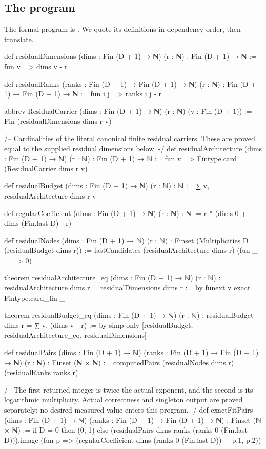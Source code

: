 \documentclass[11pt,a4paper]{article}
\theoremstyle{definition}
\theoremstyle{remark}
\numberwithin{equation}{section}
\begin{document}
\subsection{The program}
The formal program is . We quote its definitions in dependency order, then translate.
\begin{LeanCode}
def residualDimensions (dims : Fin (D + 1) → ℕ) (r : ℕ) : Fin (D + 1) → ℕ :=
  fun v => dims v - r

def residualRanks (ranks : Fin (D + 1) → Fin (D + 1) → ℕ) (r : ℕ) :
    Fin (D + 1) → Fin (D + 1) → ℕ := fun i j => ranks i j - r

abbrev ResidualCarrier (dims : Fin (D + 1) → ℕ) (r : ℕ) (v : Fin (D + 1)) :=
  Fin (residualDimensions dims r v)

/-- Cardinalities of the literal canonical finite residual carriers. These
are proved equal to the supplied residual dimensions below. -/
def residualArchitecture (dims : Fin (D + 1) → ℕ) (r : ℕ) : Fin (D + 1) → ℕ :=
  fun v => Fintype.card (ResidualCarrier dims r v)

def residualBudget (dims : Fin (D + 1) → ℕ) (r : ℕ) : ℕ :=
  ∑ v, residualArchitecture dims r v

def regularCoefficient (dims : Fin (D + 1) → ℕ) (r : ℕ) : ℕ :=
  r * (dims 0 + dims (Fin.last D) - r)

def residualNodes (dims : Fin (D + 1) → ℕ) (r : ℕ) :
    Finset (Multiplicities D (residualBudget dims r)) :=
  fastCandidates (residualArchitecture dims r) (fun _ _ => 0)

theorem residualArchitecture_eq (dims : Fin (D + 1) → ℕ) (r : ℕ) :
    residualArchitecture dims r = residualDimensions dims r := by
  funext v
  exact Fintype.card_fin _

theorem residualBudget_eq (dims : Fin (D + 1) → ℕ) (r : ℕ) :
    residualBudget dims r = ∑ v, (dims v - r) := by
  simp only [residualBudget, residualArchitecture_eq, residualDimensions]

def residualPairs (dims : Fin (D + 1) → ℕ)
    (ranks : Fin (D + 1) → Fin (D + 1) → ℕ) (r : ℕ) : Finset (ℕ × ℕ) :=
  computedPairs (residualNodes dims r) (residualRanks ranks r)

/-- The first returned integer is twice the actual exponent, and the second
is its logarithmic multiplicity. Actual correctness and singleton output
are proved separately; no desired measured value enters this program. -/
def exactFitPairs (dims : Fin (D + 1) → ℕ)
    (ranks : Fin (D + 1) → Fin (D + 1) → ℕ) : Finset (ℕ × ℕ) :=
  if D = 0 then {(0, 1)} else
    (residualPairs dims ranks (ranks 0 (Fin.last D))).image
      (fun p => (regularCoefficient dims (ranks 0 (Fin.last D)) + p.1, p.2))
\end{LeanCode}
\end{document}

